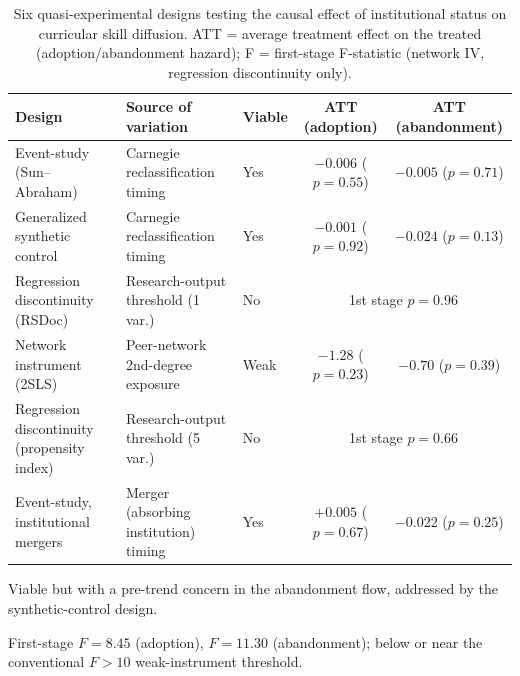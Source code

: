 \documentclass[11pt, letterpaper]{article}
\begin{document}
\begin{table}[H]
\centering
\scriptsize
\caption{Six quasi-experimental designs testing the causal effect of institutional status on curricular skill diffusion. ATT = average treatment effect on the treated (adoption/abandonment hazard); F = first-stage F-statistic (network IV, regression discontinuity only).}
\label{tab:battery}
\begin{threeparttable}
\begin{tabular}{lllcc}
\toprule
Design & Source of variation & Viable & ATT (adoption) & ATT (abandonment) \\
\midrule
Event-study (Sun--Abraham) & Carnegie reclassification timing & Yes\tnote{a} & $-0.006$ ($p=0.55$) & $-0.005$ ($p=0.71$) \\
Generalized synthetic control & Carnegie reclassification timing & Yes & $-0.001$ ($p=0.92$) & $-0.024$ ($p=0.13$) \\
Regression discontinuity (RSDoc) & Research-output threshold (1 var.) & No & \multicolumn{2}{c}{1st stage $p=0.96$} \\
Network instrument (2SLS) & Peer-network 2nd-degree exposure & Weak & $-1.28$ ($p=0.23$)\tnote{b} & $-0.70$ ($p=0.39$)\tnote{b} \\
Regression discontinuity (propensity index) & Research-output threshold (5 var.) & No & \multicolumn{2}{c}{1st stage $p=0.66$} \\
Event-study, institutional mergers & Merger (absorbing institution) timing & Yes & $+0.005$ ($p=0.67$) & $-0.022$ ($p=0.25$) \\
\bottomrule
\end{tabular}
\begin{tablenotes}
\scriptsize
\item[a] Viable but with a pre-trend concern in the abandonment flow, addressed by the synthetic-control design.
\item[b] First-stage $F=8.45$ (adoption), $F=11.30$ (abandonment); below or near the conventional $F>10$ weak-instrument threshold.
\end{tablenotes}
\end{threeparttable}
\end{table}
\end{document}
